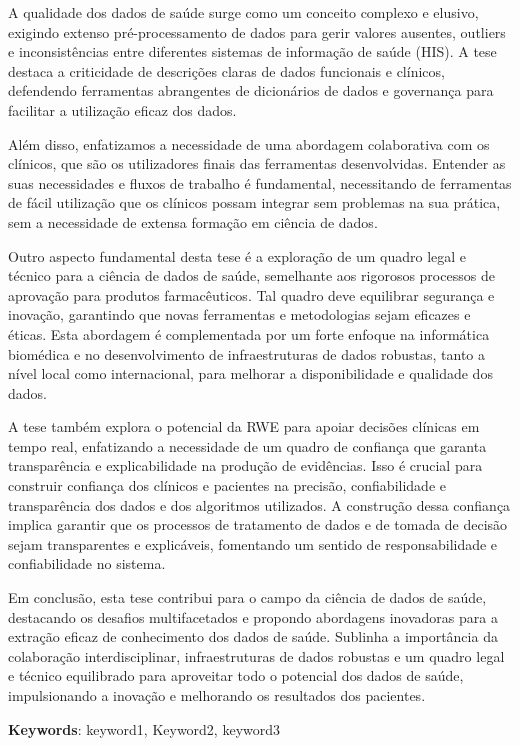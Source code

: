 A qualidade dos dados de saúde surge como um conceito complexo e elusivo, exigindo extenso pré-processamento de dados para gerir valores ausentes, outliers e inconsistências entre diferentes sistemas de informação de saúde (HIS). A tese destaca a criticidade de descrições claras de dados funcionais e clínicos, defendendo ferramentas abrangentes de dicionários de dados e governança para facilitar a utilização eficaz dos dados.

Além disso, enfatizamos a necessidade de uma abordagem colaborativa com os clínicos, que são os utilizadores finais das ferramentas desenvolvidas. Entender as suas necessidades e fluxos de trabalho é fundamental, necessitando de ferramentas de fácil utilização que os clínicos possam integrar sem problemas na sua prática, sem a necessidade de extensa formação em ciência de dados.

Outro aspecto fundamental desta tese é a exploração de um quadro legal e técnico para a ciência de dados de saúde, semelhante aos rigorosos processos de aprovação para produtos farmacêuticos. Tal quadro deve equilibrar segurança e inovação, garantindo que novas ferramentas e metodologias sejam eficazes e éticas. Esta abordagem é complementada por um forte enfoque na informática biomédica e no desenvolvimento de infraestruturas de dados robustas, tanto a nível local como internacional, para melhorar a disponibilidade e qualidade dos dados.

A tese também explora o potencial da RWE para apoiar decisões clínicas em tempo real, enfatizando a necessidade de um quadro de confiança que garanta transparência e explicabilidade na produção de evidências. Isso é crucial para construir confiança dos clínicos e pacientes na precisão, confiabilidade e transparência dos dados e dos algoritmos utilizados. A construção dessa confiança implica garantir que os processos de tratamento de dados e de tomada de decisão sejam transparentes e explicáveis, fomentando um sentido de responsabilidade e confiabilidade no sistema.

Em conclusão, esta tese contribui para o campo da ciência de dados de saúde, destacando os desafios multifacetados e propondo abordagens inovadoras para a extração eficaz de conhecimento dos dados de saúde. Sublinha a importância da colaboração interdisciplinar, infraestruturas de dados robustas e um quadro legal e técnico equilibrado para aproveitar todo o potencial dos dados de saúde, impulsionando a inovação e melhorando os resultados dos pacientes.

\vspace*{10mm}\noindent
\textbf{Keywords}: keyword1, Keyword2, keyword3
